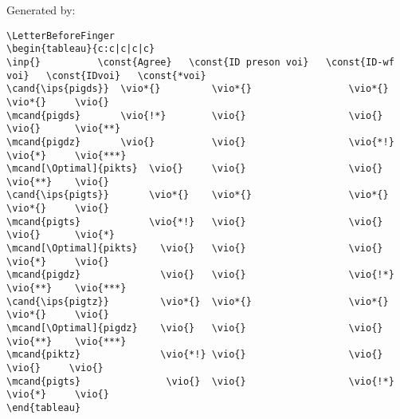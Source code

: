 \documentclass{article}
\begin{document}
\bigskip

Generated by:

\begin{verbatim}
\LetterBeforeFinger
\begin{tableau}{c:c|c|c|c}
\inp{}        	\const{Agree}	\const{ID preson voi}	\const{ID-wf voi}	\const{IDvoi}	\const{*voi}
\cand{\ips{pigds}} 	\vio*{}		    \vio*{}					\vio*{}				\vio*{}		\vio{}
\mcand{pigds}		\vio{!*}		\vio{}					\vio{}				\vio{}		\vio{**}
\mcand{pigdz}    	\vio{}			\vio{}					\vio{*!}			\vio{*}		\vio{***}
\mcand[\Optimal]{pikts}  \vio{}		\vio{}					\vio{}				\vio{**}	\vio{}
\cand{\ips{pigts}}       \vio*{}	\vio*{}					\vio*{}				\vio*{}		\vio{}
\mcand{pigts}            \vio{*!}	\vio{}					\vio{}				\vio{}		\vio{*}
\mcand[\Optimal]{pikts}    \vio{}	\vio{}					\vio{}				\vio{*}		\vio{}
\mcand{pigdz}              \vio{}	\vio{}					\vio{!*}			\vio{**}	\vio{***}
\cand{\ips{pigtz}}         \vio*{}	\vio*{}					\vio*{} 			\vio*{} 	\vio{}  
\mcand[\Optimal]{pigdz}    \vio{}	\vio{}					\vio{} 				\vio{**}	\vio{***}
\mcand{piktz}    		   \vio{*!}	\vio{}					\vio{}				 \vio{}		\vio{}
\mcand{pigts}     			\vio{}	\vio{}					\vio{!*}			\vio{*}		\vio{}
\end{tableau}
\end{verbatim}
\end{document}
